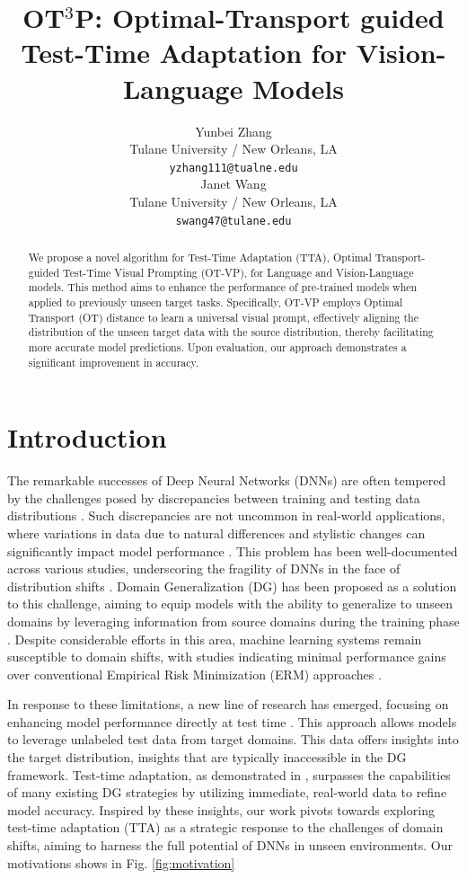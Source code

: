 \documentclass[11pt,a4paper]{article}
\title{OT$^3$P: Optimal-Transport guided Test-Time Adaptation for Vision-Language Models}
\author{Yunbei Zhang \\
  Tulane University / New Orleans, LA \\
  \texttt{yzhang111@tualne.edu} \\\And
  Janet Wang \\
  Tulane University / New Orleans, LA \\
  \texttt{swang47@tulane.edu} \\}
\date{}
\begin{document}
\maketitle
\begin{abstract}
  We propose a novel algorithm for Test-Time Adaptation (TTA), Optimal Transport-guided Test-Time Visual Prompting (OT-VP), for Language and Vision-Language models.
  This method aims to enhance the performance of pre-trained models when applied to previously unseen target tasks. 
  Specifically, OT-VP employs Optimal Transport (OT) distance to learn a universal visual prompt, effectively aligning the distribution of the unseen target data with the source distribution, thereby facilitating more accurate model predictions. 
  Upon evaluation, our approach demonstrates a significant improvement in accuracy. 

\end{abstract}


\section{Introduction}

The remarkable successes of Deep Neural Networks (DNNs) are often tempered by the challenges posed by discrepancies between training and testing data distributions \cite{recht2019imagenet, hendrycks2019benchmarking, koh2021wilds}.
Such discrepancies are not uncommon in real-world applications, where variations in data due to natural differences and stylistic changes can significantly impact model performance \cite{ li2017deeper}.
This problem has been well-documented across various studies, underscoring the fragility of DNNs in the face of distribution shifts \cite{hendrycks2019benchmarking}. 
Domain Generalization (DG) has been proposed as a solution to this challenge, aiming to equip models with the ability to generalize to unseen domains by leveraging information from source domains during the training phase \cite{blanchard2011generalizing, zhou2022domain}. 
Despite considerable efforts in this area, machine learning systems remain susceptible to domain shifts, with studies indicating minimal performance gains over conventional Empirical Risk Minimization (ERM) approaches \cite{gulrajani2020search, mehra2022do}.

In response to these limitations, a new line of research has emerged, focusing on enhancing model performance directly at test time \cite{wang2021tent, NEURIPS2021_1415fe9f}. 
This approach allows models to leverage unlabeled test data from target domains. 
This data offers insights into the target distribution, insights that are typically inaccessible in the DG framework. 
Test-time adaptation, as demonstrated in \cite{NEURIPS2021_1415fe9f}, surpasses the capabilities of many existing DG strategies by utilizing immediate, real-world data to refine model accuracy.
Inspired by these insights, our work pivots towards exploring test-time adaptation (TTA) as a strategic response to the challenges of domain shifts, aiming to harness the full potential of DNNs in unseen environments. Our motivations shows in Fig. \ref{fig:motivation}
\end{document}
